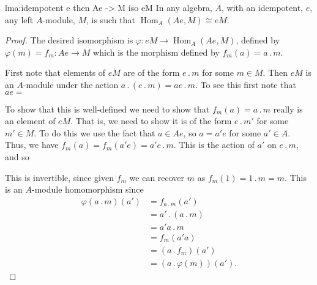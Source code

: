 \documentclass[fleqn]{NotesClass}
\DeclareMathOperator{\Hom}{Hom}
\newcommand{\action}{\mathbin{.}}
\newcommand{\isomorphic}{\cong}
\begin{document}
    \begin{lma}{}{lma:idempotent e then Ae -> M iso eM}
        In any algebra, \(A\), with an idempotent, \(e\), any left \(A\)-module, \(M\), is such that \(\Hom_A(Ae, M) \isomorphic eM\).
        \begin{proof}
            The desired isomorphism is \(\varphi \colon eM \to \Hom_A(Ae, M)\), defined by \(\varphi(m) = f_m \colon Ae \to M\) which is the morphism defined by \(f_m(a) = a \action m\).
            
            First note that elements of \(eM\) are of the form \(e \action m\) for some \(m \in M\).
            Then \(eM\) is an \(A\)-module under the action \(a \action (e \action m) = ae \action m\).
            To see this first note that \(ae = \)
            
            To show that this is well-defined we need to show that \(f_m(a) = a \action m\) really is an element of \(eM\).
            That is, we need to show it is of the form \(e \action m'\) for some \(m' \in M\).
            To do this we use the fact that \(a \in Ae\), so \(a = a'e\) for some \(a' \in A\).
            Thus, we have \(f_m(a) = f_m(a'e) = a'e \action m\).
            This is the action of \(a'\) on \(e \action m\), and so 
             
            This is invertible, since given \(f_m\) we can recover \(m\) as \(f_m(1) = 1 \action m = m\).
            This is an \(A\)-module homomorphism since
            \begin{align}
                \varphi(a \action m)(a') &= f_{a \action m}(a')\\
                &= a' \action (a \action m)\\
                &= a'a \action m\\
                &= f_{m}(a'a)\\
                &= (a \action f_m)(a')\\
                &= (a \action \varphi(m))(a').
            \end{align} 
        \end{proof}
    \end{lma}
    
\end{document}
